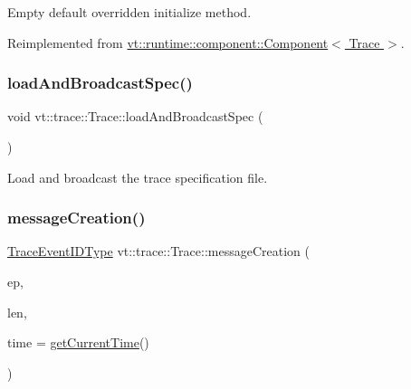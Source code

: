 Empty default overridden initialize method. 



Reimplemented from \hyperlink{structvt_1_1runtime_1_1component_1_1_component_a7f07384d294e59796add9ce6be2d6410}{vt\+::runtime\+::component\+::\+Component$<$ Trace $>$}.

\mbox{\label{structvt_1_1trace_1_1_trace_a06f74f8d2c0c2fb97be14a264fd36a45}} 
\subsubsection{\texorpdfstring{load\+And\+Broadcast\+Spec()}{loadAndBroadcastSpec()}}
{\footnotesize\ttfamily void vt\+::trace\+::\+Trace\+::load\+And\+Broadcast\+Spec (\begin{DoxyParamCaption}{ }\end{DoxyParamCaption})}



Load and broadcast the trace specification file. 

\mbox{\label{structvt_1_1trace_1_1_trace_a5b5091197568d7ed104bb40d68b4ddd7}} 
\subsubsection{\texorpdfstring{message\+Creation()}{messageCreation()}}
{\footnotesize\ttfamily \hyperlink{namespacevt_1_1trace_a64a7185f3e102df8d8258f263ccd1582}{Trace\+Event\+I\+D\+Type} vt\+::trace\+::\+Trace\+::message\+Creation (\begin{DoxyParamCaption}\item[{\hyperlink{namespacevt_1_1trace_a3c14050715ba9eceaeff51fb3de64f2f}{Trace\+Entry\+I\+D\+Type} const}]{ep,  }\item[{\hyperlink{namespacevt_1_1trace_aeb598f45d67d41db7902e494f2f0ce59}{Trace\+Msg\+Len\+Type} const}]{len,  }\item[{double const}]{time = {\ttfamily \hyperlink{structvt_1_1trace_1_1_trace_lite_ad1d8159d645a3b7047ce3f2e0c080f8d}{get\+Current\+Time}()} }\end{DoxyParamCaption})}



